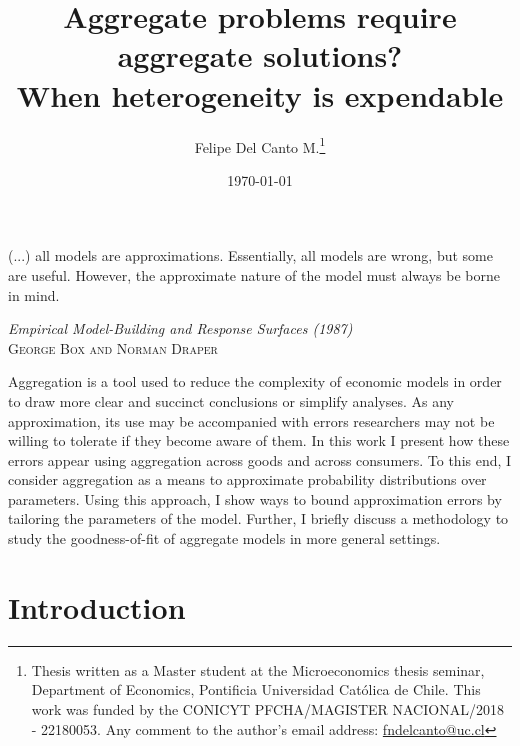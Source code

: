 \documentclass[english, a4paper, 12pt]{article}
\author{Felipe Del Canto M.\footnote{Thesis written as a Master student at the Microeconomics thesis seminar, Department of Economics, Pontificia Universidad Católica de Chile. This work was funded by the CONICYT PFCHA/MAGISTER NACIONAL/2018 - 22180053. Any comment to the author’s email address: \href{mailto:fndelcanto@uc.cl}{fndelcanto@uc.cl}}}
\title{Aggregate problems require aggregate solutions? \\ When heterogeneity is expendable}
\date{\today}
\begin{document}
\maketitle
\thispagestyle{empty}


\vfill
\epigraph{(...) all models are approximations. Essentially, all models are wrong, but some are useful. However, %
the approximate nature of the model must always be borne in mind.}{\textit{Empirical Model-Building and Response Surfaces (1987)} \\ \textsc{George Box and Norman Draper}}

\vfill
{\abstract Aggregation is a tool used to reduce the complexity of economic models in order to draw more clear and succinct conclusions or simplify analyses. As any approximation, its use may be accompanied with errors researchers may not be willing to tolerate if they become aware of them. In this work I present how these errors appear using aggregation across goods and across consumers. To this end, I consider aggregation as a means to approximate probability distributions over parameters. Using this approach, I show ways to bound approximation errors by tailoring the parameters of the model. Further, I briefly discuss a methodology to study the goodness-of-fit of aggregate models in more general settings.}
\vfill


\newpage
\section{Introduction}
\end{document}

